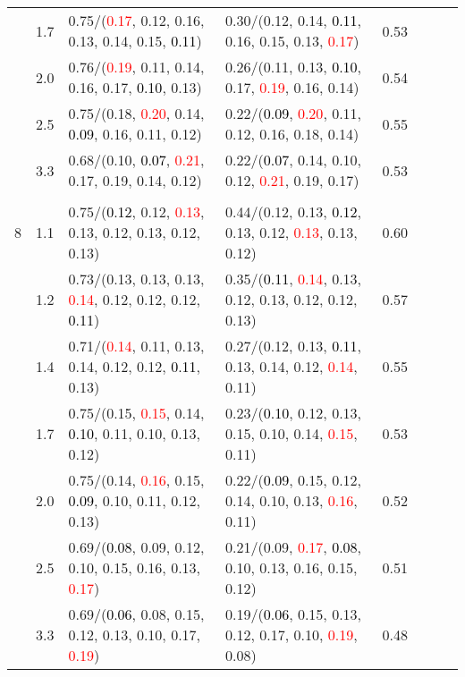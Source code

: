 \documentclass[10pt,a4paper]{report}
\begin{document}
\begin{table}[!htbp]
\begin{center}
{\begin{tabular}{ccllcccc}
			&1.7&0.75/(\textcolor{red}{0.17}, 0.12, 0.16, 0.13, 0.14, 0.15, \textcolor{black}{0.11})&0.30/(0.12, 0.14, \textcolor{black}{0.11}, 0.16, 0.15, 0.13, \textcolor{red}{0.17})&0.53\\
			&2.0&0.76/(\textcolor{red}{0.19}, 0.11, 0.14, 0.16, 0.17, \textcolor{black}{0.10}, 0.13)&0.26/(0.11, 0.13, \textcolor{black}{0.10}, 0.17, \textcolor{red}{0.19}, 0.16, 0.14)&0.54\\
			&2.5&0.75/(0.18, \textcolor{red}{0.20}, 0.14, \textcolor{black}{0.09}, 0.16, 0.11, 0.12)&0.22/(\textcolor{black}{0.09}, \textcolor{red}{0.20}, 0.11, 0.12, 0.16, 0.18, 0.14)&0.55\\
			&3.3&0.68/(0.10, \textcolor{black}{0.07}, \textcolor{red}{0.21}, 0.17, 0.19, 0.14, 0.12)&0.22/(\textcolor{black}{0.07}, 0.14, 0.10, 0.12, \textcolor{red}{0.21}, 0.19, 0.17)&0.53\\
			&&&&\\
			8			&1.1&0.75/(\textcolor{black}{0.12}, 0.12, \textcolor{red}{0.13}, 0.13, 0.12, 0.13, 0.12, 0.13)&0.44/(0.12, 0.13, \textcolor{black}{0.12}, 0.13, 0.12, \textcolor{red}{0.13}, 0.13, 0.12)&0.60\\
			&1.2&0.73/(0.13, 0.13, 0.13, \textcolor{red}{0.14}, 0.12, 0.12, 0.12, \textcolor{black}{0.11})&0.35/(\textcolor{black}{0.11}, \textcolor{red}{0.14}, 0.13, 0.12, 0.13, 0.12, 0.12, 0.13)&0.57\\
			&1.4&0.71/(\textcolor{red}{0.14}, 0.11, 0.13, 0.14, 0.12, 0.12, \textcolor{black}{0.11}, 0.13)&0.27/(0.12, 0.13, \textcolor{black}{0.11}, 0.13, 0.14, 0.12, \textcolor{red}{0.14}, 0.11)&0.55\\
			&1.7&0.75/(0.15, \textcolor{red}{0.15}, 0.14, \textcolor{black}{0.10}, 0.11, 0.10, 0.13, 0.12)&0.23/(\textcolor{black}{0.10}, 0.12, 0.13, 0.15, 0.10, 0.14, \textcolor{red}{0.15}, 0.11)&0.53\\
			&2.0&0.75/(0.14, \textcolor{red}{0.16}, 0.15, \textcolor{black}{0.09}, 0.10, 0.11, 0.12, 0.13)&0.22/(\textcolor{black}{0.09}, 0.15, 0.12, 0.14, 0.10, 0.13, \textcolor{red}{0.16}, 0.11)&0.52\\
			&2.5&0.69/(\textcolor{black}{0.08}, 0.09, 0.12, 0.10, 0.15, 0.16, 0.13, \textcolor{red}{0.17})&0.21/(0.09, \textcolor{red}{0.17}, \textcolor{black}{0.08}, 0.10, 0.13, 0.16, 0.15, 0.12)&0.51\\
			&3.3&0.69/(\textcolor{black}{0.06}, 0.08, 0.15, 0.12, 0.13, 0.10, 0.17, \textcolor{red}{0.19})&0.19/(\textcolor{black}{0.06}, 0.15, 0.13, 0.12, 0.17, 0.10, \textcolor{red}{0.19}, 0.08)&0.48\\
			\bottomrule
		\end{tabular}}
	\end{center}
\end{table}
\end{document}
